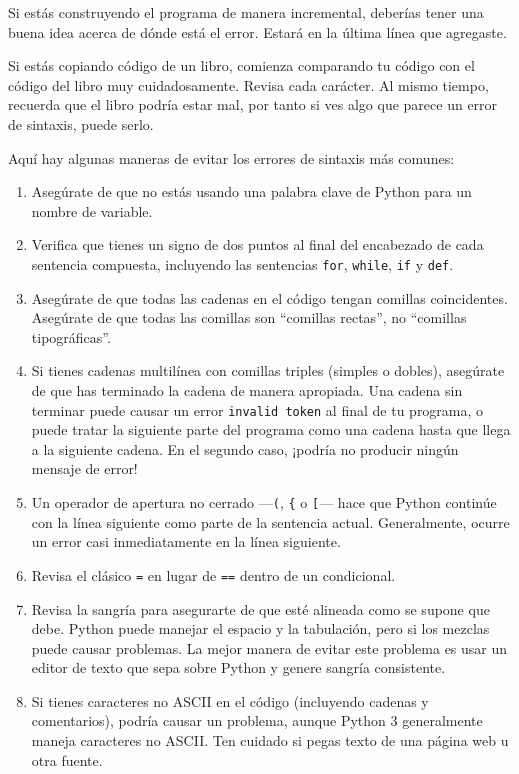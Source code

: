 \documentclass[10pt]{book}
\begin{document}
Si estás construyendo el programa de manera incremental, deberías tener
una buena idea acerca de dónde está el error.  Estará en la última
línea que agregaste.

Si estás copiando código de un libro, comienza comparando
tu código con el código del libro muy cuidadosamente.  Revisa cada carácter.
Al mismo tiempo, recuerda que el libro podría estar mal, por tanto
si ves algo que parece un error de sintaxis, puede serlo.

Aquí hay algunas maneras de evitar los errores de sintaxis más comunes:

\begin{enumerate}

\item Asegúrate de que no estás usando una palabra clave de Python para un nombre de variable.

\item Verifica que tienes un signo de dos puntos al final del encabezado de cada
sentencia compuesta, incluyendo las sentencias {\tt for}, {\tt while},
{\tt if} y {\tt def}.

\item Asegúrate de que todas las cadenas en el código tengan comillas
coincidentes.  Asegúrate de que todas las comillas son
``comillas rectas'', no ``comillas tipográficas''.

\item Si tienes cadenas multilínea con comillas triples (simples o dobles),
asegúrate de que has terminado la cadena de manera apropiada.  Una cadena sin terminar
puede causar un error {\tt invalid token} al final de tu programa,
o puede tratar la siguiente parte del programa como una cadena hasta que
llega a la siguiente cadena.  En el segundo caso, ¡podría no producir ningún mensaje
de error!

\item Un operador de apertura no cerrado ---\verb+(+, \verb+{+ o
  \verb+[+--- hace que Python continúe con la línea siguiente como parte de la
  sentencia actual.  Generalmente, ocurre un error casi inmediatamente en
  la línea siguiente.

\item Revisa el clásico {\tt =} en lugar de {\tt ==} dentro
de un condicional.

\item Revisa la sangría para asegurarte de que esté alineada como se
supone que debe.  Python puede manejar el espacio y la tabulación, pero si los mezclas
puede causar problemas.  La mejor manera de evitar este problema
es usar un editor de texto que sepa sobre Python y genere
sangría consistente.

\item Si tienes caracteres no ASCII en el código (incluyendo cadenas
y comentarios), podría causar un problema, aunque Python 3 generalmente
maneja caracteres no ASCII.  Ten cuidado si pegas texto de
una página web u otra fuente.

\end{enumerate}
\end{document}
